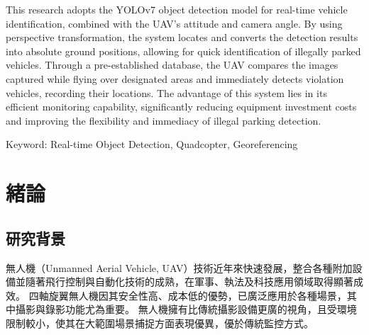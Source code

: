 \documentclass[12pt]{article}       %
\begin{document}
This research adopts the YOLOv7 object detection model for real-time vehicle identification, combined with the UAV's attitude and camera angle.
By using perspective transformation, the system locates and converts the detection results into absolute ground positions, allowing for quick identification of illegally parked vehicles.
Through a pre-established database, the UAV compares the images captured while flying over designated areas and immediately detects violation vehicles, recording their locations. The advantage of this system lies in its efficient monitoring capability, significantly reducing equipment investment costs and improving the flexibility and immediacy of illegal parking detection.

\vspace{1.5em}
\noindent Keyword: Real-time Object Detection, Quadcopter, Georeferencing
\newpage  %


\begin{center}
\tableofcontents  %
\thispagestyle{empty}  %
\end{center}

\newpage  %


\setcounter{page}{1}  %


\section{\centering 緒論}

\subsection{研究背景} 
\hspace{2em}
無人機（Unmanned Aerial Vehicle, UAV）技術近年來快速發展，整合各種附加設備並隨著飛行控制與自動化技術的成熟，在軍事、執法及科技應用領域取得顯著成效。
四軸旋翼無人機因其安全性高、成本低的優勢，已廣泛應用於各種場景，其中攝影與錄影功能尤為重要。
無人機擁有比傳統攝影設備更廣的視角，且受環境限制較小，使其在大範圍場景捕捉方面表現優異，優於傳統監控方式。
\end{document}
